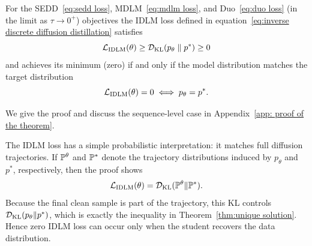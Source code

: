     \begin{theorem}
    \vspace{-1mm}
    \label{thm:unique solution} 
        For the SEDD~\eqref{eq:sedd loss}, MDLM~\eqref{eq:mdlm loss}, and Duo~\eqref{eq:duo loss} (in the limit as $\tau \to 0^{+}$) objectives the IDLM loss defined in equation~\eqref{eq:inverse discrete diffusion distillation} satisfies
        \begin{equation}
            \mathcal{L}_{\text{IDLM}}(\theta) \geq \mathcal{D}_{\text{KL}}(p_{\theta} \parallel p^*)\geq 0 \nonumber
        \end{equation}
        and achieves its minimum (zero) if and only if the model distribution matches the target distribution
        \vspace{-2mm}
        \begin{equation}
            \mathcal{L}_{\text{IDLM}}(\theta) = 0 \iff p_{\theta} = p^*. \nonumber
        \end{equation}
    \vspace{-2mm}
    \end{theorem}
    \vspace{-5mm}
    
    We give the proof and discuss the sequence-level case in Appendix~\ref{app: proof of the theorem}.

    The IDLM loss has a simple probabilistic interpretation: it matches full diffusion trajectories. If $\mathbb{P}^\theta$ and $\mathbb{P}^*$ denote the trajectory distributions induced by $p_\theta$ and $p^*$, respectively, then the proof shows
    \[
        \mathcal{L}_{\mathrm{IDLM}}(\theta)
        =
        \mathcal{D}_{\mathrm{KL}}(\mathbb{P}^\theta\|\mathbb{P}^*).
    \]
    Because the final clean sample is part of the trajectory, this KL controls $\mathcal{D}_{\mathrm{KL}}(p_\theta\|p^*)$, which is exactly the inequality in Theorem~\ref{thm:unique solution}. Hence zero IDLM loss can occur only when the student recovers the data distribution.


